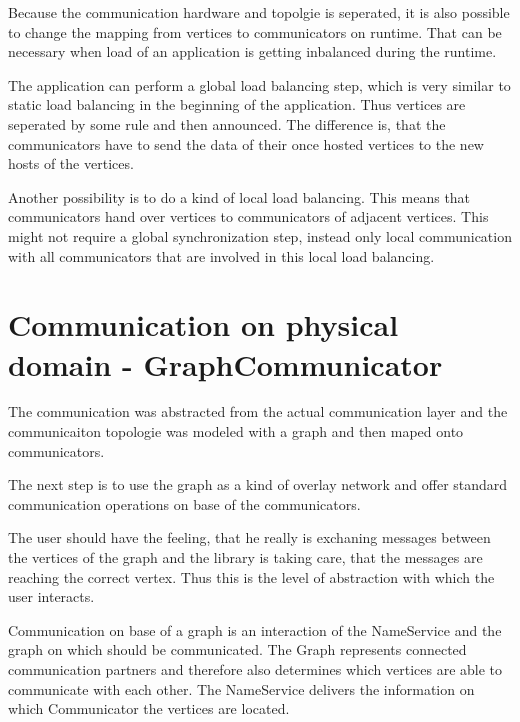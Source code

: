 Because the communication hardware and topolgie is seperated,
it is also possible to change the mapping from vertices to 
communicators on runtime. That can be necessary when load
of an application is getting inbalanced during the runtime.

The application can perform a global load balancing step, which
is very similar to static load balancing in the beginning
of the application. Thus vertices are seperated by some rule
and then announced. The difference is, that the communicators
have to send the data of their once hosted vertices to the
new hosts of the vertices.

Another possibility is to do a kind of local load balancing.
This means that communicators hand over vertices to communicators
of adjacent vertices. This might not require a global synchronization
step, instead only local communication with all communicators
that are involved in this local load balancing.

\section{Communication on physical domain - GraphCommunicator}
The communication was abstracted from the actual communication layer
and the communicaiton topologie was modeled with a graph and then
maped onto communicators.

The next step is to use the graph as a kind of overlay network and
offer standard communication operations on base of the communicators.

The user should have the feeling, that he really is exchaning messages
between the vertices of the graph and the library is taking care, that
the messages are reaching the correct vertex. Thus this is the level
of abstraction with which the user interacts.

Communication on base of a graph is an interaction of the NameService
and the graph on which should be communicated. The Graph represents
connected communication partners and therefore also determines which
vertices are able to communicate with each other. The NameService
delivers the information on which Communicator the vertices are
located.

